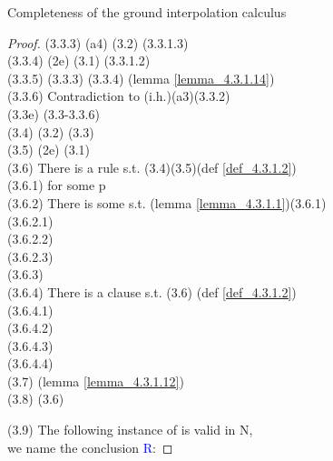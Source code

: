 \begin{theorem}{Completeness of the ground interpolation calculus}
\begin{proof}
	\noindent
	\indent \indent (3.3.3)  (a4) (3.2) (3.3.1.3)\\
	\indent \indent (3.3.4)  (2e) (3.1) (3.3.1.2)\\
	\indent \indent (3.3.5)  (3.3.3) (3.3.4) (lemma \ref{lemma_4.3.1.14})\\
	\indent \indent (3.3.6) Contradiction to (i.h.)(a3)(3.3.2)\\
	\indent (3.3e)  (3.3-3.3.6)\\
	\indent (3.4)  (3.2) (3.3)\\
	\indent (3.5)  (2e) (3.1)\\
	\indent (3.6) There is a rule  s.t. (3.4)(3.5)(def \ref{def_4.3.1.2})\\
	\indent \indent (3.6.1)  for some p\\
	\indent \indent (3.6.2) There is some \m{\textcolor{blue}{B}} s.t. (lemma \ref{lemma_4.3.1.1})(3.6.1)\\
	\indent \indent \indent (3.6.2.1) \\
	\indent \indent \indent (3.6.2.2) \\
	\indent \indent \indent (3.6.2.3) \\
	\indent \indent (3.6.3)  \\
	\indent \indent (3.6.4) There is a clause  s.t. (3.6) (def \ref{def_4.3.1.2})\\
	\indent \indent \indent (3.6.4.1) \\
	\indent \indent \indent (3.6.4.2) \\
	\indent \indent \indent (3.6.4.3) \\
	\indent \indent \indent (3.6.4.4) \\
	\indent (3.7)  (lemma \ref{lemma_4.3.1.12})\\
	\indent (3.8)  (3.6)
	
	\noindent
	\indent (3.9)  \hangindent=1.5cm The following instance of  is valid in N,\\
	we name the conclusion \textcolor{blue}{R}:
	
	\bigskip
	
	\hangindent=0cm


\end{proof}
\end{theorem}
